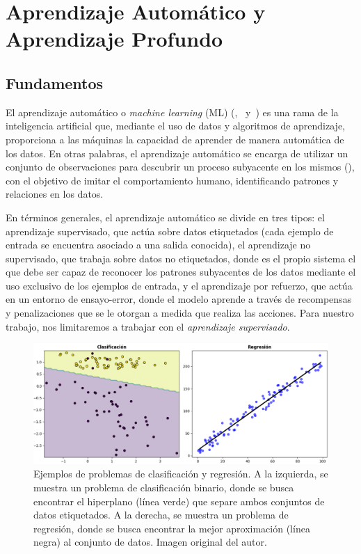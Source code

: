 
\chapter{Aprendizaje Automático y Aprendizaje Profundo}\label{ch:capitulo-aprendizaje-automatico-y-profundo}

\section{Fundamentos}\label{sec:fundamentos-aprendizaje-automatico-y-aprendizaje-profundo}
El aprendizaje automático o \emph{machine learning} (ML) (\cite{Bishop2006},~\cite{Murphy2022} y~\cite{Murphy2023}) es una rama de la inteligencia artificial que, mediante el uso de datos y algoritmos de aprendizaje, proporciona a las máquinas la capacidad de aprender de manera automática de los datos. En otras palabras, el aprendizaje automático se encarga de utilizar un conjunto de observaciones para descubrir un proceso subyacente en los mismos (\cite{Mostafa2012}), con el objetivo de imitar el comportamiento humano, identificando patrones y relaciones en los datos.\newline

En términos generales, el aprendizaje automático se divide en tres tipos: el aprendizaje supervisado, que actúa sobre datos etiquetados (cada ejemplo de entrada se encuentra asociado a una salida conocida), el aprendizaje no supervisado, que trabaja sobre datos no etiquetados, donde es el propio sistema el que debe ser capaz de reconocer los patrones subyacentes de los datos mediante el uso exclusivo de los ejemplos de entrada, y el aprendizaje por refuerzo, que actúa en un entorno de ensayo-error, donde el modelo aprende a través de recompensas y penalizaciones que se le otorgan a medida que realiza las acciones. Para nuestro trabajo, nos limitaremos a trabajar con el \emph{aprendizaje supervisado}.\newline

\begin{figure}[h]
    \centering
    \includegraphics[width=0.8\linewidth]{img/clasi-regresion.png}
    \caption[Ejemplos de problemas de clasificación y regresión.]{Ejemplos de problemas de clasificación y regresión. A la izquierda, se muestra un problema de clasificación binario, donde se busca encontrar el hiperplano (línea verde) que separe ambos conjuntos de datos etiquetados. A la derecha, se muestra un problema de regresión, donde se busca encontrar la mejor aproximación (línea negra) al conjunto de datos. Imagen original del autor.}\label{fig:clasi-regresion}
\end{figure}

